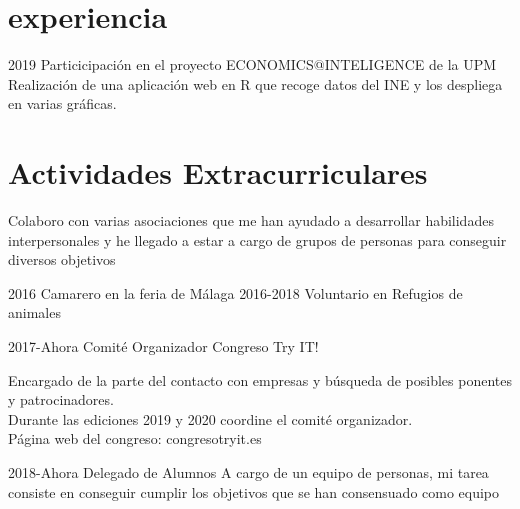 \documentclass[]{moderncv}
\begin{document}





\section{experiencia}

\begin{twenty}
  \twentyitem
    {2019}
    {Particicipación en el proyecto ECONOMICS@INTELIGENCE de la UPM}
    {}
    {Realización de una aplicación web en R que recoge datos del INE y los despliega en varias gráficas.}
  \end{twenty}
\section{Actividades Extracurriculares}
Colaboro con varias asociaciones que  me  han ayudado a desarrollar habilidades interpersonales y he llegado a estar a cargo de grupos de personas para conseguir diversos objetivos
\\
\begin{twentyshort}
  \twentyitemshort
    {2016}
    {Camarero en la feria de Málaga}
  \twentyitemshort
    {2016-2018}
    {Voluntario en Refugios de animales}
\end{twentyshort}
\begin{twenty}
  \twentyitem
    {2017-Ahora}
    {Comité Organizador}
    {Congreso Try IT!}
    {
    Encargado de la parte del contacto con empresas y búsqueda de posibles
    ponentes y patrocinadores. \\ 
    Durante las ediciones 2019 y 2020 coordine el comité organizador. 
    \\Página web del congreso: congresotryit.es

    }
  \twentyitem
    {2018-Ahora}
    {Delegado de Alumnos}
    {}
    {A cargo de un equipo de personas, mi tarea consiste en conseguir cumplir los objetivos que se han consensuado como equipo}
\end{twenty}
\end{document}
